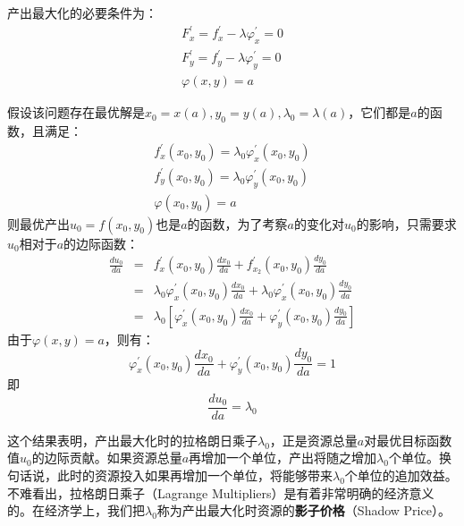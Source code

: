 产出最大化的必要条件为：
\begin{equation}
\begin{array}{l}
  F_x^\prime = f_x^\prime - \lambda \varphi_x^\prime = 0 \\
  F_y^\prime = f_y^\prime - \lambda \varphi_y^\prime = 0 \\
  \varphi(x,y) = a
\end{array}
\end{equation}

假设该问题存在最优解是$x_0 = x(a), y_0 = y(a), \lambda_0 = \lambda(a)$，它们都是$a$的函数，且满足：
\begin{equation}
\begin{array}{l}
  f_x^\prime(x_0,y_0) = \lambda_0 \varphi_x^\prime(x_0,y_0)  \\
  f_y^\prime(x_0,y_0) = \lambda_0 \varphi_y^\prime(x_0,y_0)  \\
  \varphi(x_0,y_0) = a
\end{array}
\end{equation}
则最优产出$u_0 = f(x_0,y_0)$也是$a$的函数，为了考察$a$的变化对$u_0$的影响，只需要求$u_0$相对于$a$的边际函数：
\begin{equation}
\begin{array}{lcl}
  \frac{d u_0}{d a} & = & f_x^\prime(x_0,y_0) \frac{d x_0}{d a} + f_{x_2}^\prime(x_0,y_0) \frac{d y_0}{d a} \\
  & = & \lambda_0 \varphi_x^\prime(x_0,y_0) \frac{d x_0}{d a} + \lambda_0 \varphi_x^\prime(x_0,y_0) \frac{d y_0}{d a}\\
  & = & \lambda_0[\varphi_x^\prime(x_0,y_0) \frac{d x_0}{d a} + \varphi_y^\prime(x_0,y_0) \frac{d y_0}{d a}]
\end{array}
\end{equation}
由于$\varphi(x,y) = a$，则有：
\begin{equation}
  \varphi_x^\prime(x_0,y_0) \frac{d x_0}{d a} + \varphi_y^\prime(x_0,y_0) \frac{d y_0}{d a} = 1
\end{equation}
即
\begin{equation}
  \frac{d u_0}{d a} = \lambda_0
\end{equation}

这个结果表明，产出最大化时的拉格朗日乘子$\lambda_0$，正是资源总量$a$对最优目标函数值$u_0$的边际贡献。如果资源总量$a$再增加一个单位，产出将随之增加$\lambda_0$个单位。换句话说，此时的资源投入如果再增加一个单位，将能够带来$\lambda_0$个单位的追加效益。不难看出，拉格朗日乘子（Lagrange Multipliers）是有着非常明确的经济意义的。在经济学上，我们把$\lambda_0$称为产出最大化时资源的\textbf{影子价格}（Shadow Price）。

